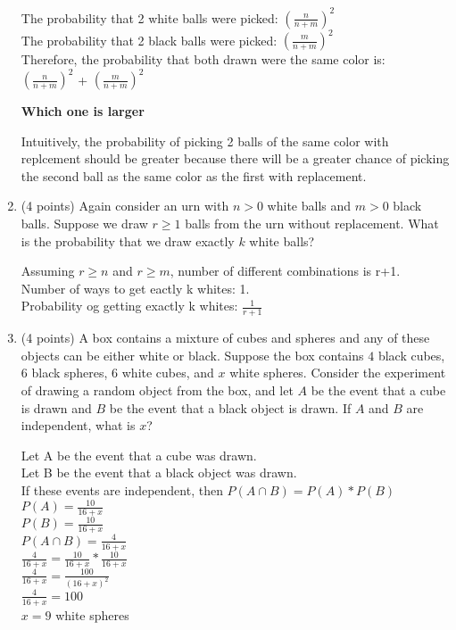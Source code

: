 \documentclass[11pt]{article}
\begin{document}
\begin{enumerate}
	The probability that 2 white balls were picked: $(\frac{n}{n+m})^{2}$ \\
	The probability that 2 black balls were picked: $(\frac{m}{n+m})^{2}$ \\
	Therefore, the probability that both drawn were the same color is: \\
	$(\frac{n}{n+m})^{2}$ + $(\frac{m}{n+m})^{2}$ 

{\bf Which one is larger}

	Intuitively, the probability of picking 2 balls of the same color with
	replcement should be greater because there will be a greater chance of 
	picking the second ball as the same color as the first with replacement.

\item (4 points) Again consider an urn with $n>0$ white balls and $m >0$ black
balls.  Suppose we draw $r\geq 1$ balls from the urn without replacement.  What
is the probability that we draw exactly $k$ white balls?

Assuming $r\geq n$ and $r\geq m$, number of different combinations is r+1. \\
Number of ways to get eactly k whites: 1. \\
Probability og getting exactly k whites: $\frac{1}{r+1}$

\item (4 points) A box contains a mixture of cubes and spheres and any of these
objects can be either white or black.  Suppose the box contains $4$ black
cubes, $6$ black spheres, $6$ white cubes, and $x$ white spheres.  Consider the
experiment of drawing a random object from the box, and let $A$ be the event
that a cube is drawn and $B$ be the event that a black object is drawn.
If $A$ and $B$ are independent, what is $x$?

	Let A be the event that a cube was drawn. \\
	Let B be the event that a black object was drawn. \\
	If these events are independent, then $P(A \cap B) = P(A) * P(B)$ \\
	$P(A) = \frac{10}{16+x}$ \\
	$P(B) = \frac{10}{16+x}$ \\
	$P(A \cap B) = \frac{4}{16+x}$ \\
	$\frac{4}{16+x} = \frac{10}{16+x} * \frac{10}{16+x}$ \\
	$\frac{4}{16+x} = \frac{100}{(16+x)^{2}}$ \\
	$\frac{4}{16+x} = 100$ \\
	$x = 9$ white spheres



\end{enumerate}
\end{document}
